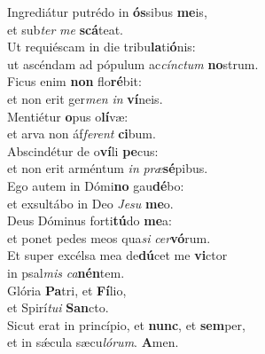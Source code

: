 \oddverse Ingrediátur putrédo in \textbf{ós}sibus \textbf{me}is,~\*\\
\oddverse et sub\textit{ter} \textit{me} \textbf{scá}teat.\\
\evenverse Ut requiéscam in die tribu\textbf{la}ti\textbf{ó}nis:~\*\\
\evenverse ut ascéndam ad pópulum ac\textit{cín}\textit{ctum} \textbf{no}strum.\\
\oddverse Ficus enim \textbf{non} flo\textbf{ré}bit:~\*\\
\oddverse et non erit ger\textit{men} \textit{in} \textbf{ví}neis.\\
\evenverse Mentiétur \textbf{o}pus o\textbf{lí}væ:~\*\\
\evenverse et arva non áf\textit{fe}\textit{rent} \textbf{ci}bum.\\
\oddverse Abscindétur de o\textbf{ví}li \textbf{pe}cus:~\*\\
\oddverse et non erit arméntum \textit{in} \textit{præ}\textbf{sé}pibus.\\
\evenverse Ego autem in Dómi\textbf{no} gau\textbf{dé}bo:~\*\\
\evenverse et exsultábo in Deo \textit{Je}\textit{su} \textbf{me}o.\\
\oddverse Deus Dóminus forti\textbf{tú}do \textbf{me}a:~\*\\
\oddverse et ponet pedes meos qua\textit{si} \textit{cer}\textbf{vó}rum.\\
\evenverse Et super excélsa mea de\textbf{dú}cet me \textbf{vi}ctor~\*\\
\evenverse in psal\textit{mis} \textit{ca}\textbf{nén}tem.\\
\oddverse Glória \textbf{Pa}tri, et \textbf{Fí}lio,~\*\\
\oddverse et Spirí\textit{tu}\textit{i} \textbf{San}cto.\\
\evenverse Sicut erat in princípio, et \textbf{nunc}, et \textbf{sem}per,~\*\\
\evenverse et in sǽcula sæcu\textit{ló}\textit{rum}. \textbf{A}men.\\
